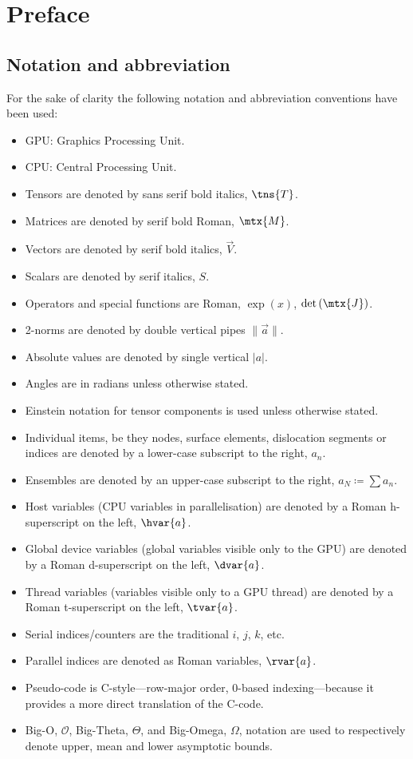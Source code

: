 \addtocounter{chapter}{-1}
\chapter{Preface}
\label{c:pre}

\section{Notation and abbreviation}
\label{s:nota}

For the sake of clarity the following notation and abbreviation conventions have been used:
\begin{itemize}
	\item GPU: Graphics Processing Unit.
	\item CPU: Central Processing Unit.
	\item Tensors are denoted by sans serif bold italics, $ \tns{T} $.
	\item Matrices are denoted by serif bold Roman, $ \mtx{M} $.
	\item Vectors are denoted by serif bold italics, $ \vec{V} $.
	\item Scalars are denoted by serif italics, $ S $.
	\item Operators and special functions are Roman, $\exp(x)$, $\det{\left(\mtx{J}\right)}$.
	\item 2-norms are denoted by double vertical pipes $\lVert \vec{a} \rVert$.
	\item Absolute values are denoted by single vertical $\lvert a \rvert$.
	\item Angles are in radians unless otherwise stated.
	\item Einstein notation for tensor components is used unless otherwise stated.
	\item Individual items, be they nodes, surface elements, dislocation segments or indices are denoted by a lower-case subscript to the right, $a_n$.
	\item Ensembles are denoted by an upper-case subscript to the right, $a_N \coloneqq \sum a_n$.
	\item Host variables (CPU variables in parallelisation) are denoted by a Roman h-superscript on the left, $\hvar{a}$.
	\item Global device variables (global variables visible only to the GPU) are denoted by a Roman d-superscript on the left, $\dvar{a}$.
	\item Thread variables (variables visible only to a GPU thread) are denoted by a Roman t-superscript on the left, $\tvar{a}$.
	\item Serial indices/counters are the traditional $i$, $j$, $k$, etc.
	\item Parallel indices are denoted as Roman variables, $\rvar{a}$.
	\item Pseudo-code is C-style---row-major order, 0-based indexing---because it provides a more direct translation of the C-code.
	\item Big-O, $\mathcal{O}$, Big-Theta, $\Theta$, and Big-Omega, $\Omega$, notation are used to respectively denote upper, mean and lower asymptotic bounds.
\end{itemize}

